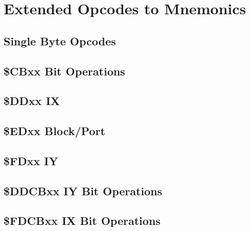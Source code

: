 \section{Extended Opcodes to Mnemonics}
\subsection{Single Byte Opcodes}
\subsection{\$CBxx Bit Operations}
\subsection{\$DDxx IX}
\subsection{\$EDxx Block/Port}
\subsection{\$FDxx IY}
\subsection{\$DDCBxx IY Bit Operations}
\subsection{\$FDCBxx IX Bit Operations}

